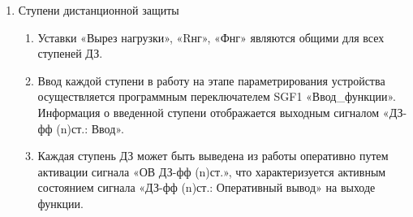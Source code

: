 \begin{enumerate}
\begin{enumerate}
\item
Пусковые  условия  функции  сформируются  только  в  том  случае,  если  отсутствуют  какие-либо блокировки. При  активации  сигнала  пуска,  реле  сопротивления  при  котором  остается  в  сработанном состоянии, запускается таймер Т1 выдержки времени на срабатывание ступени ДЗ. По истечении времени таймера Т1, и отсутствии сигнала блокировки формируется срабатывание ступени ДЗ.

\item
Каждая  ступень  ДЗ  имеет  возможность  оперативного  ускорения.  Оперативное  ускорение  может вводиться:
\begin{itemize} 
    \item при выводе основной защиты оборудования; 
    \item при опробовании оборудования рабочим напряжением; 
    \item при операциях с разъединителями на противоположном конце ВЛ.
\end{itemize}
\item
Для каждой ступени ДЗ предусмотрена возможность ввода автоматического  ускорения при включении выключателя. Функция контроля отсутствия напряжения позволяет ускорять защиту ДЗ при опробовании высоковольтного оборудования. Контроль отсутствия напряжения осуществляется защитой минимального напряжения, цепи которой подключены к ТН, установленному на линии.
\item
Параметры для настройки ДЗ приведены в таблице \ref{dz:tbl0}.

\end{enumerate}

\item\label{sec:sec2} Ступени дистанционной защиты
\begin{enumerate}

\item
Уставки  «Вырез  нагрузки»,  «Rнг»,  «Фнг»  являются  общими  для  всех  ступеней ДЗ. 

\item
Ввод каждой ступени в работу на этапе параметрирования устройства осуществляется программным переключателем SGF1 «Ввод\_функции». Информация о введенной ступени отображается выходным сигналом «ДЗ-фф (n)ст.: Ввод».
\item
Каждая ступень ДЗ может быть выведена из работы оперативно путем активации сигнала «ОВ ДЗ-фф (n)ст.», что характеризуется активным состоянием сигнала «ДЗ-фф (n)ст.: Оперативный вывод» на выходе функции.


\end{enumerate}
\end{enumerate}
